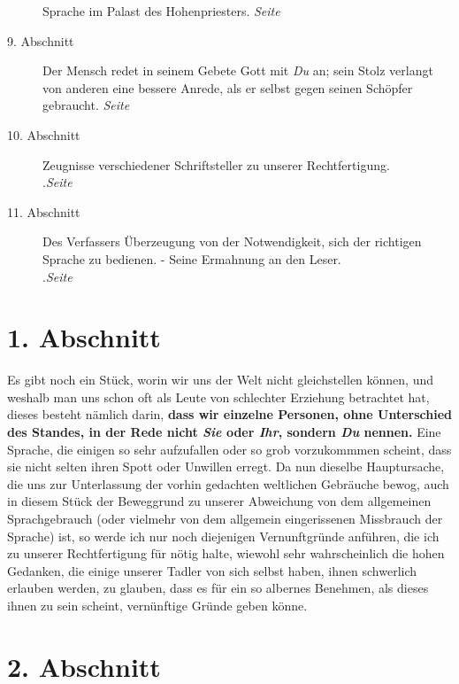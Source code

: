 \begin{description}
Sprache im Palast des Hohenpriesters.
\dotfill \textit{Seite~\pageref{kap10_ab8}}\\
\item[9. Abschnitt] Der Mensch redet in seinem Gebete Gott mit \textit{Du} an;
sein
Stolz verlangt von anderen eine bessere Anrede, als er selbst gegen seinen
Schöpfer gebraucht.
\dotfill \textit{Seite~\pageref{kap10_ab9}}\\
\item[10. Abschnitt] Zeugnisse verschiedener Schriftsteller zu unserer
Rechtfertigung.\\
.\dotfill \textit{Seite~\pageref{kap10_ab10}}\\
\item[11. Abschnitt] Des Verfassers Überzeugung von der Notwendigkeit, sich
der richtigen Sprache zu bedienen. - Seine Ermahnung an den Leser.
\\.\dotfill \textit{Seite~\pageref{kap10_ab11}}

\end{description}

\newpage

\section{1. Abschnitt} \label{kap10_ab1}

Es gibt noch ein Stück, worin wir uns der Welt nicht
gleichstellen können, und
weshalb man uns schon oft als Leute von schlechter Erziehung betrachtet hat,
dieses besteht nämlich darin, \textbf{dass wir einzelne
Personen, ohne Unterschied des
Standes, in der Rede nicht \textit{Sie} oder \textit{Ihr}, sondern \textit{Du}
nennen.} Eine
Sprache, die einigen so sehr aufzufallen oder so grob vorzukommmen scheint, dass
sie nicht selten ihren Spott oder Unwillen erregt. Da nun dieselbe Hauptursache,
die uns zur Unterlassung der vorhin gedachten weltlichen Gebräuche bewog, auch
in diesem Stück der Beweggrund zu unserer Abweichung von dem allgemeinen
Sprachgebrauch (oder vielmehr von dem allgemein eingerissenen Missbrauch der
Sprache) ist, so werde ich nur noch diejenigen Vernunftgründe anführen, die ich
zu unserer Rechtfertigung für nötig halte, wiewohl sehr wahrscheinlich die
hohen Gedanken, die einige unserer Tadler von sich selbst haben, ihnen
schwerlich erlauben werden, zu glauben, dass es für ein so albernes Benehmen,
als
dieses ihnen zu sein scheint, vernünftige Gründe geben könne.

\section{2. Abschnitt} \label{kap10_ab2}

